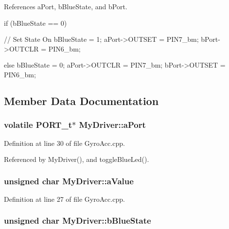 References aPort, bBlueState, and bPort.


\begin{DoxyCode}
                         {
        if (bBlueState == 0) {
            // Set State On
            bBlueState = 1;
            aPort->OUTSET = PIN7_bm;
            bPort->OUTCLR = PIN6_bm;

        } else {
            bBlueState = 0;
            aPort->OUTCLR = PIN7_bm;
            bPort->OUTSET = PIN6_bm;
        }
    }
\end{DoxyCode}


\subsection{Member Data Documentation}
\hypertarget{class_my_driver_a2ff747dc440f916889ca47eb83c6c8bb}{
\subsubsection[{aPort}]{\setlength{\rightskip}{0pt plus 5cm}volatile PORT\_\-t$\ast$ {\bf MyDriver::aPort}}}
\label{class_my_driver_a2ff747dc440f916889ca47eb83c6c8bb}


Definition at line 30 of file GyroAcc.cpp.



Referenced by MyDriver(), and toggleBlueLed().

\hypertarget{class_my_driver_abbda5bbd4b31df4e179c06afd7e9fd1d}{
\subsubsection[{aValue}]{\setlength{\rightskip}{0pt plus 5cm}unsigned char {\bf MyDriver::aValue}}}
\label{class_my_driver_abbda5bbd4b31df4e179c06afd7e9fd1d}


Definition at line 27 of file GyroAcc.cpp.

\hypertarget{class_my_driver_a8c999beb402c2ae78c7e66463188aadf}{
\subsubsection[{bBlueState}]{\setlength{\rightskip}{0pt plus 5cm}unsigned char {\bf MyDriver::bBlueState}}}
\label{class_my_driver_a8c999beb402c2ae78c7e66463188aadf}


